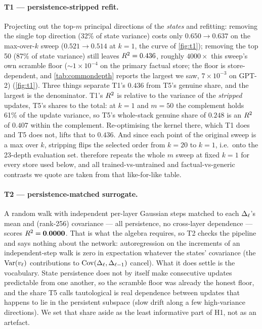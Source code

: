 \paragraph{T1 --- persistence-stripped refit.}
Projecting out the top-$m$ principal directions of the \emph{states} and
refitting: removing the single top direction (32\% of state variance) costs
only $0.650 \to 0.637$ on the max-over-$k$ sweep ($0.521 \to 0.514$ at
$k{=}1$, the curve of \cref{fig:t1}); removing the top 50 (87\% of state
variance) still
leaves \textbf{$R^2 = 0.436$}, roughly $4000\times$ this sweep's own scramble
floor (${\sim}1\times10^{-4}$ on the primary factual store; the floor is
store-dependent, and \cref{tab:commondepth} reports the largest we saw,
$7\times10^{-3}$ on GPT-2)
(\cref{fig:t1}). Three things separate T1's $0.436$ from T5's genuine
share, and the largest is the denominator. T1's $R^2$ is relative to the
variance of the \emph{stripped} updates, T5's shares to the total: at
$k{=}1$ and $m{=}50$ the complement holds 61\% of the update variance, so
T5's whole-stack genuine share of $0.248$ is an $R^2$ of $0.407$ within the
complement. Re-optimising the kernel there, which T1 does and T5 does not,
lifts that to $0.436$. And since each point of the original sweep is a max
over $k$, stripping flips the selected order from $k{=}20$ to $k{=}1$, i.e.\
onto the 23-depth evaluation set.  therefore repeats the whole
$m$ sweep at fixed $k{=}1$ for every store used below, and all
trained-vs-untrained and factual-vs-generic contrasts we quote are taken from
that like-for-like table.

\paragraph{T2 --- persistence-matched surrogate.}
A random walk with independent per-layer Gaussian steps matched to each
$\Delta_\ell$'s mean and (rank-256) covariance --- all persistence, no cross-layer
dependence --- scores $R^2 = \mathbf{0.0000}$. That is what the algebra
requires, so T2 checks the pipeline and says nothing about the network:
autoregression on the increments of an independent-step walk is zero in
expectation whatever the states' covariance (the $\mathrm{Var}(v_\ell)$
contributions to $\mathrm{Cov}(\Delta_\ell,\Delta_{\ell-1})$ cancel). What it does
settle is the vocabulary. State persistence does not by itself make
consecutive updates predictable from one another, so the scramble floor was
already the honest floor, and the share T5 calls tautological is real
dependence between updates that happens to lie in the persistent subspace
(slow drift along a few high-variance directions). We set that share aside
as the least informative part of H1, not as an artefact.

